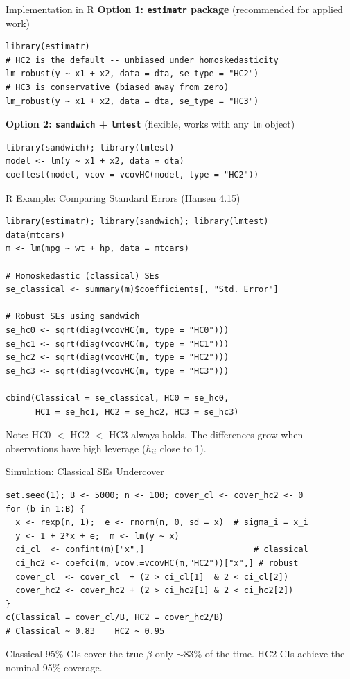 \documentclass[aspectratio=169, handout, t]{beamer}
\numberwithin{equation}{section}
\begin{document}
\begin{frame}[fragile]{Implementation in R}
\textbf{Option 1: \texttt{estimatr} package} (recommended for applied work)
\begin{lstlisting}
library(estimatr)
# HC2 is the default -- unbiased under homoskedasticity
lm_robust(y ~ x1 + x2, data = dta, se_type = "HC2")
# HC3 is conservative (biased away from zero)
lm_robust(y ~ x1 + x2, data = dta, se_type = "HC3")
\end{lstlisting}\pause
\textbf{Option 2: \texttt{sandwich} + \texttt{lmtest}} (flexible, works with any \texttt{lm} object)
\begin{lstlisting}
library(sandwich); library(lmtest)
model <- lm(y ~ x1 + x2, data = dta)
coeftest(model, vcov = vcovHC(model, type = "HC2"))
\end{lstlisting}
\end{frame}

\begin{frame}[fragile]{R Example: Comparing Standard Errors (Hansen 4.15)}
\begin{lstlisting}
library(estimatr); library(sandwich); library(lmtest)
data(mtcars)
m <- lm(mpg ~ wt + hp, data = mtcars)

# Homoskedastic (classical) SEs
se_classical <- summary(m)$coefficients[, "Std. Error"]

# Robust SEs using sandwich
se_hc0 <- sqrt(diag(vcovHC(m, type = "HC0")))
se_hc1 <- sqrt(diag(vcovHC(m, type = "HC1")))
se_hc2 <- sqrt(diag(vcovHC(m, type = "HC2")))
se_hc3 <- sqrt(diag(vcovHC(m, type = "HC3")))

cbind(Classical = se_classical, HC0 = se_hc0,
      HC1 = se_hc1, HC2 = se_hc2, HC3 = se_hc3)
\end{lstlisting}
\medskip
Note: HC0 $<$ HC2 $<$ HC3 always holds.  The differences grow when observations have high leverage ($h_{ii}$ close to 1).
\end{frame}

\begin{frame}[fragile]{Simulation: Classical SEs Undercover}
\begin{lstlisting}
set.seed(1); B <- 5000; n <- 100; cover_cl <- cover_hc2 <- 0
for (b in 1:B) {
  x <- rexp(n, 1);  e <- rnorm(n, 0, sd = x)  # sigma_i = x_i
  y <- 1 + 2*x + e;  m <- lm(y ~ x)
  ci_cl  <- confint(m)["x",]                      # classical
  ci_hc2 <- coefci(m, vcov.=vcovHC(m,"HC2"))["x",] # robust
  cover_cl  <- cover_cl  + (2 > ci_cl[1]  & 2 < ci_cl[2])
  cover_hc2 <- cover_hc2 + (2 > ci_hc2[1] & 2 < ci_hc2[2])
}
c(Classical = cover_cl/B, HC2 = cover_hc2/B)
# Classical ~ 0.83    HC2 ~ 0.95
\end{lstlisting}
\vspace{0.5em}
Classical 95\% CIs cover the true $\beta$ only $\sim$83\% of the time.  HC2 CIs achieve the nominal 95\% coverage.
\end{frame}
\end{document}
